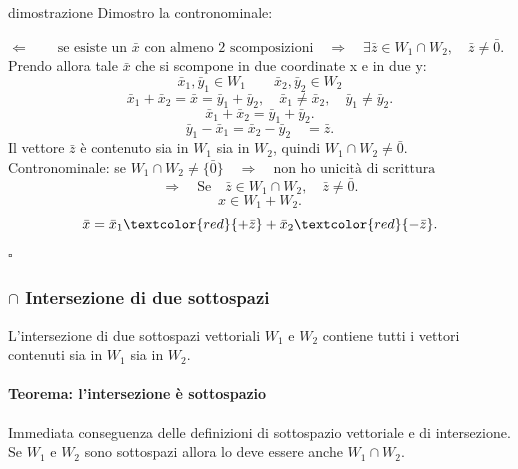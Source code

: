 \documentclass[x11names]{article}
\newcommand*{\QEDB}{\null\nobreak\hfill\ensuremath{\square}}%
\begin{document}
\begin{es}{dimostrazione}
Dimostro la contronominale:


$\Leftarrow \qquad \text{se esiste un $\bar{x}$ con almeno 2 scomposizioni} \quad \Rightarrow \quad \exists \bar{z} \in W_1 \cap W_2,\quad \bar{z} \neq \bar{0}$.\\


Prendo allora tale $\bar{x}$ che si scompone in due coordinate x e in due y:
\[
\bar{x}_{1},\bar{y}_{1} \in W_{1} \qquad \bar{x}_{2},\bar{y}_{2} \in W_{2}
\]
\[
\bar{x}_{1} + \bar{x}_{2} = \bar{x} = \bar{y}_{1} + \bar{y}_{2}, \quad \bar{x}_{1} \neq \bar{x}_{2}, \quad \bar{y}_{1} \neq \bar{y}_{2}
.\] 
\[
\bar{x}_{1} + \bar{x}_{2} = \bar{y}_{1} + \bar{y}_{2}
.\] 
\[
\bar{y}_{1} - \bar{x}_{1} = \bar{x}_{2} - \bar{y}_{2} \quad = \bar{z}
.\] 
Il vettore $\bar{z}$ è contenuto sia in $W_1$ sia in $W_2$, quindi $W_1 \cap W_2 \neq \bar{0}$. \\


Contronominale: se $W_1 \cap W_2 \neq \{\bar{0}\} \quad \Rightarrow \quad \text{non ho unicità di scrittura}$
\[
\Rightarrow \quad \text{Se} \quad \bar{z} \in W_1 \cap W_2, \quad\bar{z} \neq \bar{0}
.\] 
\[
x \in W_1 + W_2
.\] 
\[
\bar{x} = \bar{x}_{1} \textcolor{red}{+\bar{z}} + \bar{x}_{2} \textcolor{red}{-\bar{z}}
.\]  \QEDB
\end{es}


\subsubsection{$\cap$ Intersezione di due sottospazi}
L'intersezione di due sottospazi vettoriali $W_1$ e $W_2$ contiene tutti i vettori contenuti sia in $W_1$ sia in $W_2$.

\begin{center}
	\colorbox{myred}{\begin{minipage}{5.75in}
			\begin{redes}{}
				\paragraph{Teorema: l'intersezione è sottospazio}
				Immediata conseguenza delle definizioni di sottospazio vettoriale e di intersezione. Se $W_1$ e $W_2$ sono sottospazi allora lo deve essere anche $W_1 \cap W_2$.
					
			\end{redes}
	\end{minipage}}        
\end{center}
\end{document}
